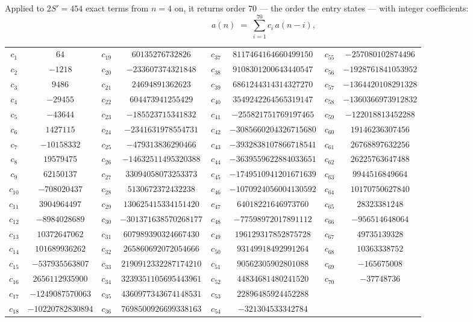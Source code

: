 \documentclass[11pt,a4paper]{article}
\theoremstyle{plain}
\theoremstyle{definition}
\begin{document}
Applied to $2S'=454$ exact terms from $n=4$ on, it returns order $70$ --- the
order the entry states --- with integer coefficients:
\[
a(n)\;=\;\sum_{i=1}^{70}c_i\,a(n-i),
\]
\begin{center}\small
\begin{tabular}{cccccccc}
$c_{1}$ & $64$ & $c_{19}$ & $60135276732826$ & $c_{37}$ & $8117464164660499150$ & $c_{55}$ & $-257080102874496$ \\
$c_{2}$ & $-1218$ & $c_{20}$ & $-233607374321848$ & $c_{38}$ & $9108301200643440547$ & $c_{56}$ & $-1928761841053952$ \\
$c_{3}$ & $9486$ & $c_{21}$ & $24694891362623$ & $c_{39}$ & $6861244314314327270$ & $c_{57}$ & $-1364420108291328$ \\
$c_{4}$ & $-29455$ & $c_{22}$ & $604473941255429$ & $c_{40}$ & $3549242264565319147$ & $c_{58}$ & $-1360366973912832$ \\
$c_{5}$ & $-43644$ & $c_{23}$ & $-185523715341832$ & $c_{41}$ & $-255821751769197465$ & $c_{59}$ & $-122018813452288$ \\
$c_{6}$ & $1427115$ & $c_{24}$ & $-2341631978554731$ & $c_{42}$ & $-3085660204326715680$ & $c_{60}$ & $19146236307456$ \\
$c_{7}$ & $-10158332$ & $c_{25}$ & $-479313836290466$ & $c_{43}$ & $-3932838107866718541$ & $c_{61}$ & $26768897632256$ \\
$c_{8}$ & $19579475$ & $c_{26}$ & $-14632511495320388$ & $c_{44}$ & $-3639559622884033651$ & $c_{62}$ & $26225763647488$ \\
$c_{9}$ & $62150137$ & $c_{27}$ & $33094058073253373$ & $c_{45}$ & $-1749510941201671639$ & $c_{63}$ & $9944516849664$ \\
$c_{10}$ & $-708020437$ & $c_{28}$ & $5130672372432238$ & $c_{46}$ & $-1070924056004130592$ & $c_{64}$ & $10170750627840$ \\
$c_{11}$ & $3904964497$ & $c_{29}$ & $130625415334151420$ & $c_{47}$ & $64018221646973760$ & $c_{65}$ & $28323381248$ \\
$c_{12}$ & $-8984028689$ & $c_{30}$ & $-301371638570268177$ & $c_{48}$ & $-77598972017891112$ & $c_{66}$ & $-956514648064$ \\
$c_{13}$ & $10372647062$ & $c_{31}$ & $607989390324667430$ & $c_{49}$ & $196129317852875728$ & $c_{67}$ & $49735139328$ \\
$c_{14}$ & $101689936262$ & $c_{32}$ & $265860692072054666$ & $c_{50}$ & $93149918492991264$ & $c_{68}$ & $10363338752$ \\
$c_{15}$ & $-537935563807$ & $c_{33}$ & $2190912332287174210$ & $c_{51}$ & $90562305902801088$ & $c_{69}$ & $-165675008$ \\
$c_{16}$ & $2656112935900$ & $c_{34}$ & $3239351105695443961$ & $c_{52}$ & $44834681480241520$ & $c_{70}$ & $-37748736$ \\
$c_{17}$ & $-1249087570063$ & $c_{35}$ & $4360977343674148531$ & $c_{53}$ & $22896485924452288$ &  &  \\
$c_{18}$ & $-10220782830894$ & $c_{36}$ & $7698500926699338163$ & $c_{54}$ & $-321304533342784$ &  &  \\
\end{tabular}
\end{center}
\end{document}
